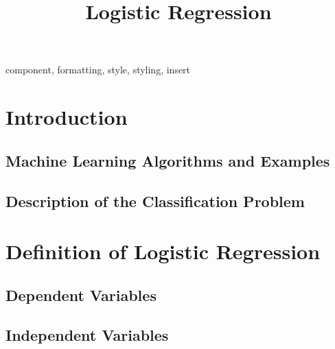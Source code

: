 \documentclass[conference]{IEEEtran}
\begin{document}
\title{Logistic Regression\\
}

\author{
}

\maketitle

\begin{abstract}

\end{abstract}

\begin{IEEEkeywords}
component, formatting, style, styling, insert
\end{IEEEkeywords}

\section{Introduction}


\subsection{Machine Learning Algorithms and Examples}


\subsection{Description of the Classification Problem}


\section{Definition of Logistic Regression}

\subsection{Dependent Variables}

\subsection{Independent Variables}
\end{document}
